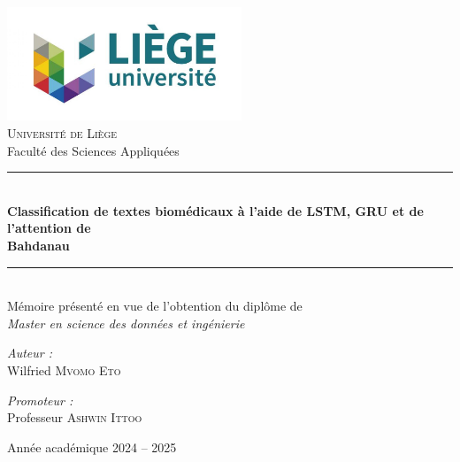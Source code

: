 \documentclass[12pt]{report}
\begin{document}
\sloppy

\begin{titlepage}
    \begin{center}
        \includegraphics[width=7cm]{images/uliege.jpg} \\[1cm]
        
        {\Huge \textsc{Université de Liège}} \\[0.5cm]
        {\Large Faculté des Sciences Appliquées} \\[2.5cm]
        
        \rule{\linewidth}{0.8mm} \\[0.4cm]
        
        {\LARGE \textbf{Classification de textes biomédicaux à l’aide de  LSTM, GRU et de l’attention de \\ Bahdanau}} \\[0.4cm]
        
        \rule{\linewidth}{0.8mm} \\[1cm]
        
        {\large 
         Mémoire présenté en vue de l’obtention du diplôme de \\[0.3cm]
        \textit{Master en science des données et ingénierie} \\[2cm]
        }
    \end{center}
    
    \vspace{-0.4cm}
    
    \begin{center}
        \begin{minipage}{0.45\textwidth}
            \flushleft
            \textit{Auteur :} \\[0.2cm]
            W\MakeLowercase{ilfried} \textsc{Mvomo Eto}
        \end{minipage}
        \begin{minipage}{0.45\textwidth}
            \flushright
            \textit{Promoteur :} \\[0.2cm]
            Professeur \textsc{Ashwin Ittoo}
        \end{minipage}
    \end{center}

    \vspace{4cm}
    \begin{center}
        {\small Année académique 2024 -- 2025}
    \end{center}
    
    \vfill
\end{titlepage}
\end{document}
